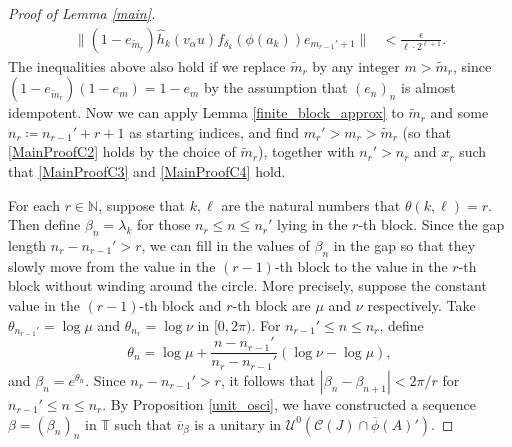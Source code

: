 \documentclass[reqno]{amsart}
\theoremstyle{definition}
\theoremstyle{remark}
\numberwithin{equation}{section}
\theoremstyle{definition}
\begin{document}
\begin{proof}[Proof of Lemma \ref{main}]
\begin{align}
\label{cross_approx4} 
\Big\| (1-e_{\tilde{m}_r}) \hat{h}_{k} (v_{\alpha} u)f_{\delta_{k}}(\phi(a_{k})) e_{m_{r-1}'+1} \Big\| &< \frac{\epsilon}{\ell\cdot 2^{\ell+1}}. 
\end{align} 
The inequalities above also hold if we replace $\tilde{m}_r$ by any integer $m > \tilde{m}_r$, since $(1-e_{\tilde{m}_r})(1-e_{m}) = 1-e_{m}$ by the assumption that $(e_{n})_{n}$ is almost idempotent. Now we can apply Lemma \ref{finite_block_approx} to $\tilde{m}_r$ and some $n_{r}\coloneqq n_{r-1}'+r+1$ as starting indices, and find $m_r' > m_{r} > \tilde{m}_r$ (so that \eqref{MainProofC2} holds by the choice of $\tilde{m}_{r}$), together with $n_{r}' > n_{r}$ and $x_r$ such that \eqref{MainProofC3} and \eqref{MainProofC4} hold. 

For each $r\in \mathbb{N}$, suppose that $k, \ell$ are the natural numbers that $\theta(k, \ell) = r$. Then define $\beta_n=\lambda_{k}$ for those $n_r\leq n\leq n_r'$ lying in the $r$-th block. Since the gap length $n_{r} - n_{r-1}'>r$, we can fill in the values of $\beta_{n}$ in the gap so that they slowly move from the value in the $(r-1)$-th block to the value in the $r$-th block without winding around the circle. More precisely, suppose the constant value in the $(r-1)$-th block and $r$-th block are $\mu$ and $\nu$ respectively. Take $\theta_{n_{r-1}'} = \log \mu$ and $\theta_{n_{r}} = \log \nu$ in $[0,2\pi)$. For $n_{r-1}' \leq n\leq n_{r}$, define 
\begin{equation} 
\theta_{n} = \log \mu + \frac{n-n_{r-1}'}{n_{r} - n_{r-1}'} (\log \nu - \log \mu), 
\end{equation} 
and $\beta_{n} = e^{\theta_{n}}$. Since $n_{r} - n_{r-1}' > r$, it follows that $|\beta_{n} - \beta_{n+1}| < 2\pi / r$ for $n_{r-1}'\leq n\leq n_{r}$. By Proposition \ref{unit_osci}, we have constructed a sequence $\beta = (\beta_{n})_{n}$ in $\mathbb{T}$ such that $\overline{v}_\beta$ is a unitary in $\mathcal U^0(\mathcal C(J)\cap \overline\phi(A)')$.


\end{proof}
\end{document}
